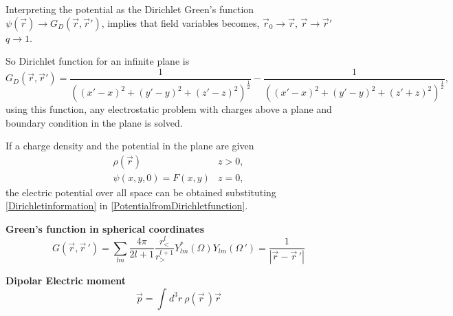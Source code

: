 \documentclass[12pt,a4paper]{article}
\newcommand{\integral}[3]{\int_{#1}^{#2} d #3 \ } %
\begin{document}
Interpreting the potential as the Dirichlet Green's function $\psi(\vec{r})\rightarrow G_{D}(\vec{r},\vec{r}')$, implies that field variables becomes, $\vec{r}_{0}\rightarrow\vec{r}$, $\vec{r}\rightarrow\vec{r}'$ $q\rightarrow1$.

So Dirichlet function for an infinite plane is
\begin{equation}
G_{D}(\vec{r},\vec{r}')=\frac{1}{((x'-x)^{2}+(y'-y)^{2}+(z'-z)^{2})^{\frac{1}{2}}}-\frac{1}{((x'-x)^{2}+(y'-y)^{2}+(z'+z)^{2})^{\frac{1}{2}}},
\end{equation}
using this function, any electrostatic problem with charges above a plane and boundary condition in the plane is solved.

If a charge density and the potential in the plane are given
\begin{equation}
	\label{Dirichletinformation}
\begin{array}{cc}
\rho (\vec{r}) & z>0, \\
\psi (x,y,0)=F(x,y) & z=0,
\end{array}
\end{equation}
the electric potential over all space can be obtained substituting \eqref{Dirichletinformation} in \eqref{PotentialfromDirichletfunction}.

\textbf{Green's function in spherical coordinates}\\
\begin{equation}
	G(\vec{r},\vec{r}\,') = \sum_{lm}\frac{4\pi}{2l+1} \frac{r_<^l}{r_>^{l+1}} Y_{lm}^*(\Omega)Y_{lm}(\Omega\,') = \frac{1}{|\vec{r}-\vec{r}\,'|}
\end{equation}

\textbf{Dipolar Electric moment}\\
\begin{equation}
	\vec{p} = \integral{}{}{^3r} \rho (\vec{r}\,)\vec{r}
\end{equation}
\end{document}
